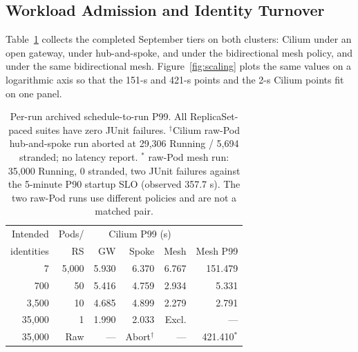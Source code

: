 \subsection{Workload Admission and Identity Turnover}
\label{sec:eval-identity}
Table~\ref{tab:identity} collects the completed September tiers on both
clusters: Cilium under an open gateway, under hub-and-spoke, and under
the bidirectional mesh policy, and \sys{} under the same bidirectional
mesh. Figure~\ref{fig:scaling} plots the same values on a logarithmic
axis so that the 151-s and 421-s \sys{} points and the 2-s Cilium points
fit on one panel.

\begin{table}[t]
\centering
\small
\setlength{\tabcolsep}{2.5pt}
\begin{tabular}{rrrrrr}
\toprule
Intended & Pods/ & \multicolumn{3}{c}{Cilium P99 (s)} & \sys{}\\
identities & RS & GW & Spoke & Mesh & Mesh P99\\
\midrule
7 & 5,000 & 5.930 & 6.370 & 6.767 & 151.479\\
700 & 50 & 5.416 & 4.759 & 2.934 & 5.331\\
3,500 & 10 & 4.685 & 4.899 & 2.279 & 2.791\\
35,000 & 1 & 1.990 & 2.033 & Excl. & ---\\
35,000 & Raw & --- & Abort$^{\dagger}$ & --- & 421.410$^{*}$\\
\bottomrule
\end{tabular}
\caption{Per-run archived schedule-to-run P99. All ReplicaSet-paced
suites have zero JUnit failures. $^{\dagger}$Cilium raw-Pod hub-and-spoke
run aborted at 29,306 Running / 5,694 stranded; no latency report.
$^{*}$\sys{} raw-Pod mesh run: 35,000 Running, 0 stranded, two JUnit
failures against the 5-minute P90 startup SLO (observed 357.7 s). The two
raw-Pod runs use different policies and are not a matched pair.}
\label{tab:identity}
\end{table}


